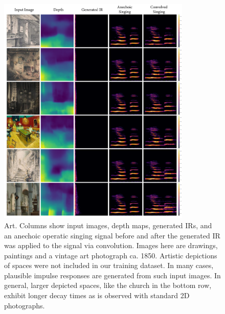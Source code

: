 \begin{figure}
    \centering
    \includegraphics[width=0.82\textwidth]{p_art.png}
    \caption{Art. Columns show input images, depth maps, generated IRs, and an anechoic operatic singing signal before and after the generated IR was applied to the signal via convolution. Images here are drawings, paintings and a vintage art photograph ca. 1850. Artistic depictions of spaces were not included in our training dataset. In many cases, plausible impulse responses are generated from such input images. In general, larger depicted spaces, like the church in the bottom row, exhibit longer decay times as is observed with standard 2D photographs.}
    \label{fig:p_art}
\end{figure}

